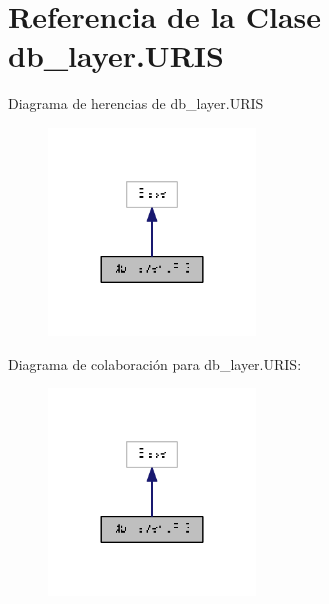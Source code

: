 \hypertarget{classdb__layer_1_1_u_r_i_s}{\section{Referencia de la Clase db\-\_\-layer.\-U\-R\-I\-S}
\label{classdb__layer_1_1_u_r_i_s}
}


Diagrama de herencias de db\-\_\-layer.\-U\-R\-I\-S\nopagebreak
\begin{figure}[H]
\begin{center}
\leavevmode
\includegraphics[width=156pt]{classdb__layer_1_1_u_r_i_s__inherit__graph}
\end{center}
\end{figure}


Diagrama de colaboración para db\-\_\-layer.\-U\-R\-I\-S\-:\nopagebreak
\begin{figure}[H]
\begin{center}
\leavevmode
\includegraphics[width=156pt]{classdb__layer_1_1_u_r_i_s__coll__graph}
\end{center}
\end{figure}
